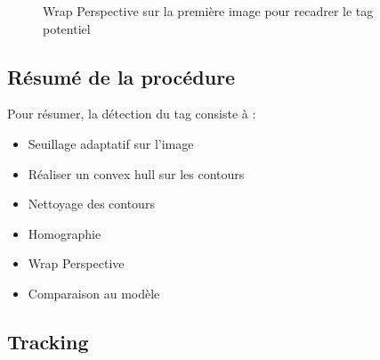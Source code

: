         \begin{figure}[h]
            \centering
            \hspace{.02\textwidth}
            \caption{Wrap Perspective sur la première image pour recadrer le tag potentiel}
        \end{figure}
            

        \subsection{Résumé de la procédure}

        Pour résumer, la détection du tag consiste à :

        \begin{itemize}
            \item Seuillage adaptatif sur l'image
            \item Réaliser un convex hull sur les contours
            \item Nettoyage des contours
            \item Homographie
            \item Wrap Perspective
            \item Comparaison au modèle
        \end{itemize}

    \subsection{Tracking}

